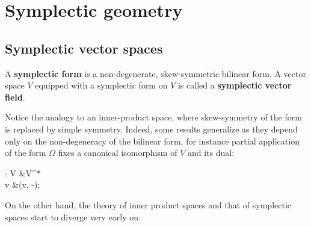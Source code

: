 \documentclass[main.tex]{subfiles}
\begin{document}
\chapter{Symplectic geometry}
\section{Symplectic vector spaces}
\begin{definition}
	A \textbf{symplectic form} is a non-degenerate, skew-symmetric bilinear form. A vector space $V$ equipped with a symplectic form on $V$ is called a \textbf{symplectic vector field}.
\end{definition}

Notice the analogy to an inner-product space, where skew-symmetry of the form is replaced by simple symmetry. Indeed, some results generalize as they depend only on the non-degeneracy of the bilinear form, for instance partial application of the form $\Omega$ fixes a canonical isomorphism of $V$ and its dual:
\begin{eqalign}
\label{eq:iso_induc_sym_form}
	\tilde\Omega : V &\longto V^*\\
	v &\longmapsto \Omega(v, -);
\end{eqalign}
On the other hand, the theory of inner product spaces and that of symplectic spaces start to diverge very early on:
\end{document}
